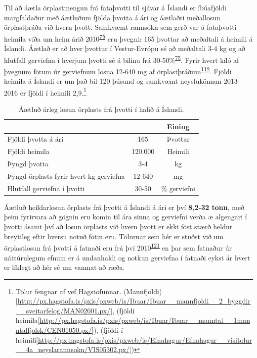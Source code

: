 \documentclass[icelandic,]{book}
\let\rmarkdownfootnote\footnote%
\def\footnote{\protect\rmarkdownfootnote}
\begin{document}
Til að áætla örplastmengun frá fataþvotti til sjávar á Íslandi er íbúafjöldi margfaldaður með áætluðum fjölda þvotta á ári og áætlaðri meðallosun örplastþráða við hvern þvott. Samkvæmt rannsókn sem gerð var á fataþvotti heimila víða um heim árið 2010\textsuperscript{\protect\hyperlink{ref-Pakula2010}{75}} eru þvegnir 165 þvottar að meðaltali á heimili á Íslandi. Áætlað er að hver þvottur í Vestur-Evrópu sé að meðaltali 3-4 kg og að hlutfall gerviefna í hverjum þvotti sé á bilinu frá 30-50\%\textsuperscript{\protect\hyperlink{ref-Pakula2010}{75}}. Fyrir hvert kíló af þvegnum fötum úr gerviefnum losna 12-640 mg af örplastþráðum\textsuperscript{\protect\hyperlink{ref-magnusson2016swedish}{112}}. Fjöldi heimila á Íslandi er um það bil 120 þúsund og samkvæmt neyslukönnun 2013-2016 er fjöldi í heimili 2,9.\footnote{Tölur fengnar af vef Hagstofunnar. (Mannfjöldi){[}\url{http://px.hagstofa.is/pxis/pxweb/is/Ibuar/Ibuar__mannfjoldi__2_byggdir__sveitarfelog/MAN02001.px/}{]}, (fjöldi heimila{[}\url{http://px.hagstofa.is/pxis/pxweb/is/Ibuar/Ibuar__manntal__1manntalfjolsk/CEN01050.px/}{]}), (fjöldi í heimili{[}\url{http://px.hagstofa.is/pxis/pxweb/is/Efnahagur/Efnahagur__visitolur__4a_neyslarannsokn/VIS05302.px/}{]})}

\begin{table}[t]

\caption{\label{tab:unnamed-chunk-13}Áætluð árleg losun örplasts frá þvotti í hafið á Íslandi.}
\centering
\begin{tabular}{lcc}
\toprule
  &  & Eining\\
\midrule
Fjöldi þvotta á ári & 165 & Þvottar\\
Fjöldi heimila & 120.000 & Heimili\\
Þyngd þvotta & 3-4 & kg\\
Þyngd örplasts fyrir hvert kg gerviefna & 12-640 & mg\\
Hlutfall gerviefna í þvotti & 30-50 & \% gerviefni\\
\bottomrule
\end{tabular}
\end{table}

Áætluð heildarlosun örplasts frá þvotti á Íslandi á ári er því \textbf{8,2-32 tonn}, með þeim fyrirvara að gögnin eru komin til ára sinna og gerviefni verða æ algengari í þvotti ásamt því að losun örplasts við hvern þvott er ekki föst stærð heldur breytileg eftir hversu notuð fötin eru. Tölurnar sem hér er stuðst við um örplastlosun frá þvotti á fatnaði eru frá því 2010\textsuperscript{\protect\hyperlink{ref-pakula2010electricity}{121}} en þar sem fatnaður úr náttúrulegum efnum er á undanhaldi og notkun gerviefna í fatnaði eykst ár hvert er líklegt að hér sé um vanmat að ræða.
\end{document}
